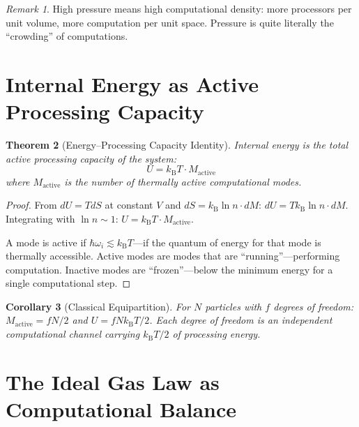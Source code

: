 \documentclass[twocolumn,10pt,a4paper]{article}
\theoremstyle{plain}
\newtheorem{theorem}{Theorem}[section]
\newtheorem{corollary}[theorem]{Corollary}
\theoremstyle{definition}
\theoremstyle{remark}
\newtheorem{remark}[theorem]{Remark}
\newcommand{\kB}{k_{\mathrm{B}}}
\begin{document}
\begin{remark}
High pressure means high computational density: more processors per unit volume, more computation per unit space. Pressure is quite literally the ``crowding'' of computations.
\end{remark}

\section{Internal Energy as Active Processing Capacity}
\label{sec:energy_capacity}

\begin{theorem}[Energy--Processing Capacity Identity]
\label{thm:energy_capacity}
Internal energy is the total active processing capacity of the system:
\begin{equation}
\boxed{U = \kB T \cdot M_{\mathrm{active}}}
\end{equation}
where $M_{\mathrm{active}}$ is the number of thermally active computational modes.
\end{theorem}

\begin{proof}
From $dU = TdS$ at constant $V$ and $dS = \kB \ln n \cdot dM$: $dU = T\kB \ln n \cdot dM$. Integrating with $\ln n \sim 1$: $U = \kB T \cdot M_{\mathrm{active}}$.

A mode is active if $\hbar\omega_i \lesssim \kB T$---if the quantum of energy for that mode is thermally accessible. Active modes are modes that are ``running''---performing computation. Inactive modes are ``frozen''---below the minimum energy for a single computational step.
\end{proof}

\begin{corollary}[Classical Equipartition]
For $N$ particles with $f$ degrees of freedom: $M_{\mathrm{active}} = fN/2$ and $U = fN\kB T/2$. Each degree of freedom is an independent computational channel carrying $\kB T/2$ of processing energy.
\end{corollary}

\section{The Ideal Gas Law as Computational Balance}
\label{sec:gas_law_computation}
\end{document}
